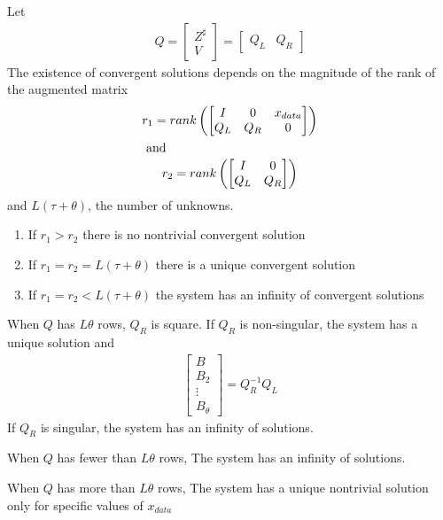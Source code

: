 \documentclass{article}
\begin{document}
\begin{thrm}
  
Let
\begin{gather*}
  Q= 
  \begin{bmatrix}
    Z^{\sharp}\\V
  \end{bmatrix}
= 
  \begin{bmatrix}
    Q_L&Q_R
  \end{bmatrix}
\end{gather*}
The existence of convergent solutions depends on the magnitude of the
rank of the augmented
matrix 
\begin{gather*}
r_1=rank \left (  
\begin{bmatrix}
    I&0&x_{data}\\
Q_L&Q_R&0
  \end{bmatrix} 
\right ) 
\\ 
\intertext{ and  }
r_2=rank \left (  \begin{bmatrix}
    I&0\\
Q_L&Q_R
  \end{bmatrix} \right )
\end{gather*}
and  $L(\tau+\theta)$, the number of unknowns.


\begin{enumerate}
\item If $r_1 > r_2$ there is no nontrivial convergent solution
\item If $r_1 = r_2 = L(\tau + \theta)$ there is a unique convergent solution
\item If $r_1 = r_2 < L(\tau + \theta)$ the system has an infinity of convergent 
solutions
\end{enumerate}

\end{thrm}


\begin{crrlry}
  When $Q$ has $L \theta$ rows, $Q_R$ is square.
If  $Q_R$ is non-singular, the system has a unique solution and
\begin{gather*}
    \begin{bmatrix}
    B\\B_2\\ \vdots \\ B_{\theta}  
  \end{bmatrix}
= Q_R^{-1} Q_L
\end{gather*}
  If $Q_R$ is singular, the system has an infinity of solutions.
\end{crrlry}
\begin{crrlry}
  When $Q$ has fewer than $L \theta$ rows,
The system has an infinity of solutions.
\end{crrlry}
\begin{crrlry}
  When $Q$ has more than $L \theta$ rows,
The system has a unique nontrivial 
solution only for specific values of $x_{data}$
\end{crrlry}
\end{document}

